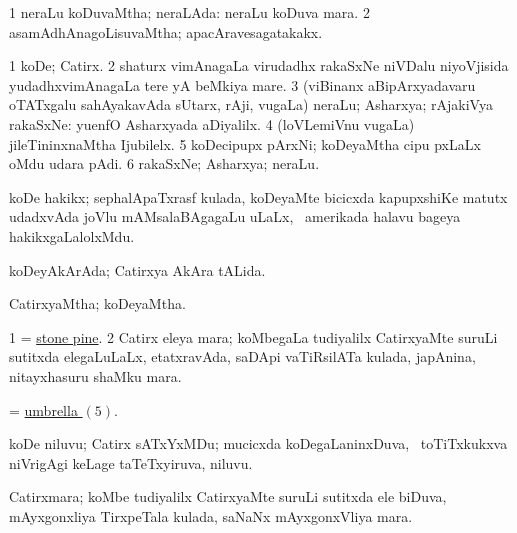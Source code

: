 \bentry
{} 
\gl{\gu}
\expl{}
\bmng
\bnum
\num{1} neraLu koDuvaMtha; neraLAda:  neraLu koDuva mara. 
\num{2} asamAdhAnagoLisuvaMtha; apacAravesagatakakx. 
\enum
\emng
\eentry

\bentry
{} 
\gl{\nA}
\bmng
\bnum
\num{1} koDe; Catirx.  
\num{2} shaturx vimAnagaLa virudadhx rakaSxNe niVDalu niyoVjisida yudadhxvimAnagaLa tere yA beMkiya mare. 
\num{3} (viBinanx aBipArxyadavaru oTATxgalu sahAyakavAda sUtarx, rAji, \mo vugaLa) neraLu; Asharxya; rAjakiVya rakaSxNe:  yuenfO Asharxyada aDiyalilx. 
\num{4} (loVLemiVnu \mo vugaLa) jileTininxnaMtha Ijubilelx. 
\hypertarget{umbrella(5)}{} 
\num{5} koDecipupx pArxNi; koDeyaMtha cipu pxLaLx oMdu udara pAdi. 
\num{6} rakaSxNe; Asharxya; neraLu. 
\enum
\emng
\eentry

\bentry
{}
\gl{\nA}
\expl{}
\bmng
koDe hakikx; sephalApaTxrasf kulada, koDeyaMte bicicxda kapupxshiKe matutx udadxvAda joVlu mAMsalaBAgagaLu uLaLx, \da\ amerikada halavu bageya hakikxgaLalolxMdu. 
\emng
\eentry

\bentry
{} 
\gl{\gu}
\expl{}
\bmng
koDeyAkArAda; Catirxya AkAra tALida. 
\emng
\eentry

\bentry
{} 
\gl{\gu}
\expl{}
\bmng
CatirxyaMtha; koDeyaMtha. 
\emng
\eentry

\bentry
{}
\gl{\nA}
\expl{}
\bmng
\bnum
\num{1} = \hyperref{kandict_s.pdf}{S}{stone pine}{stone pine}. 
\num{2} Catirx eleya mara; koMbegaLa tudiyalilx CatirxyaMte suruLi sutitxda elegaLuLaLx, etatxravAda, saDApi vaTiRsilATa kulada, japAnina, nitayxhasuru shaMku mara. 
\enum
\emng
\eentry

\bentry
{}
\gl{\nA}
\expl{}
\bmng
= \hyperlink{umbrella(5)}{umbrella \((5)\)}. 
\emng
\eentry

\bentry
{}
\gl{\nA}
\expl{}
\bmng
koDe niluvu; Catirx sATxYxMDu; mucicxda koDegaLaninxDuva, \sA\ toTiTxkukxva niVrigAgi keLage taTeTxyiruva, niluvu. 
\emng
\eentry

\bentry
{}
\gl{\nA}
\expl{}
\bmng
Catirxmara; koMbe tudiyalilx CatirxyaMte suruLi sutitxda ele biDuva, mAyxgonxliya TirxpeTala kulada, saNaNx mAyxgonxVliya mara. 
\emng
\eentry

